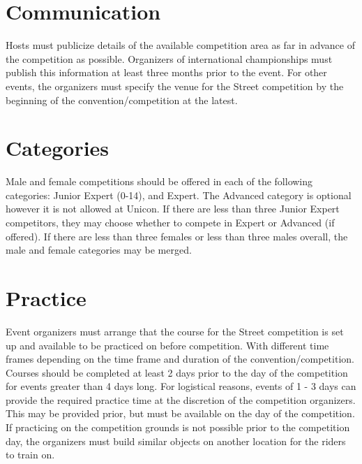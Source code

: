 \section{Communication}

Hosts must publicize details of the available competition area as far in advance of the competition as possible.
Organizers of international championships must publish this information at least three months prior to the event.
For other events, the organizers must specify the venue for the Street competition by the beginning of the convention/competition at the latest.

\section{Categories}
Male and female competitions should be offered in each of the following categories: Junior Expert (0-14), and Expert.
The Advanced category is optional however it is not allowed at Unicon.
If there are less than three Junior Expert competitors, they may choose whether to compete in Expert or Advanced (if offered).
If there are less than three females or less than three males overall, the male and female categories may be merged.

\section{Practice}

Event organizers must arrange that the course for the Street competition is set up and available to be practiced on before competition.
With different time frames depending on the time frame and duration of the convention/competition.
Courses should be completed at least 2 days prior to the day of the competition for events greater than 4 days long.
For logistical reasons, events of 1 - 3 days can provide the required practice time at the discretion of the competition organizers.
This may be provided prior, but must be available on the day of the competition.
If practicing on the competition grounds is not possible prior to the competition day, the organizers must build similar objects on another location for the riders to train on.
